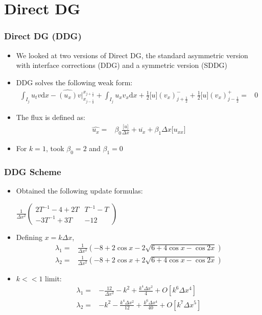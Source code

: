 \documentclass[serif,12pt]{beamer}
\begin{document}
\section{Direct DG}
\begin{frame}
  \frametitle{Direct DG (DDG)}
  \begin{itemize}
  \item We looked at two versions of Direct DG, the standard asymmetric version with interface corrections (DDG) and a symmetric version (SDDG)
  \item DDG solves the following weak form:
    \begin{align*}
      \int_{I_j} u_t v \mathrm{d}x -\widehat{(u_x)}v\bigr|_{x_{j-\frac{1}{2}}}^{x_{j+\frac{1}{2}}}+\int_{I_j} u_x v_x \mathrm{d}x+ \frac{1}{2}\lbrack u\rbrack(v_x)_{j+\frac{1}{2}}^- + \frac{1}{2}\lbrack u\rbrack(v_x)_{j-\frac{1}{2}}^+= & 0
    \end{align*}
  \item The flux is defined as:
    \begin{align*}
      \widehat{u_x} = & \beta_0 \frac{\lbrack u \rbrack}{\Delta x} + \overline{u_x} + \beta_1 \Delta x \lbrack u_{xx} \rbrack
    \end{align*}
  \item For $k=1$, took $\beta_0 = 2$ and $\beta_1 = 0$
  \end{itemize}
\end{frame}

\begin{frame}
  \frametitle{DDG Scheme}
  \begin{itemize}
  \item Obtained the following update formulas:\\
    \begin{center}
      $\frac{1}{\Delta x^2}\left(
        \begin{array}{cc}
          2T^{-1} -4+2 T & T^{-1}- T \\
          -3 T^{-1} +3 T & -12
        \end{array}
      \right)$
    \end{center}
  \item Defining $x = k\Delta x$,
    \begin{align*}
      \lambda_1 = & \frac{1}{\Delta x^2}\left(-8 + 2 \cos x - 2 \sqrt{6 + 4 \cos x - \cos 2x}\right)\\
      \lambda_2 = & \frac{1}{\Delta x^2}\left(-8 + 2 \cos x + 2 \sqrt{6 + 4 \cos x - \cos 2x}\right)
    \end{align*}
  \item $k << 1$ limit:
    \begin{align*}
      \lambda_1 = & -\frac{12}{\Delta x^2} - k^2 + \frac{k^4\Delta x^2}{4} + O[k^6\Delta x^4]\\
      \lambda_2 = & -k^2 - \frac{k^4\Delta x^2}{12} + \frac{k^6 \Delta x^4}{40} + O[k^7\Delta x^5]
    \end{align*}
  \end{itemize}
\end{frame}
\end{document}
